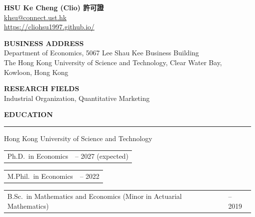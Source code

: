 \documentclass[11pt,letterpaper]{article}
\makeatletter
\newlength{\cvdatecol}
\newcommand{\sectionheader}[1]{%
  \vspace{0.55em}
  {\large\bfseries #1}\\[-0.15em]
  \rule{\textwidth}{0.4pt}\par
  \vspace{0.25em}
}
\newcommand{\cvline}[3][0em]{%
  \par\nobreak
  \noindent\hspace*{#1}%
  \begin{tabularx}{\dimexpr\textwidth-#1\relax}{@{}X@{\hspace{0.75em}}>{\raggedleft\arraybackslash}p{\cvdatecol}@{}}
  #2 & #3 \\
  \end{tabularx}%
}
\makeatother
\begin{document}
\begin{center}
{\LARGE\bfseries HSU Ke Cheng (Clio) 許可證}\\[0.55em]
\href{mailto:khsu@connect.ust.hk}{khsu@connect.ust.hk}\\[0.2em]
\href{https://cliohsu1997.github.io}{https://cliohsu1997.github.io/}
\end{center}

\vspace{0.7em}

\textbf{BUSINESS ADDRESS}\\[0.2em]
\hspace{1.5em} Department of Economics, 5067 Lee Shau Kee Business Building\\
\hspace{1.5em} The Hong Kong University of Science and Technology, Clear Water Bay, Kowloon, Hong Kong

\vspace{0.55em}

\textbf{RESEARCH FIELDS}\\[0.2em]
\hspace{1.5em} Industrial Organization, Quantitative Marketing

\sectionheader{EDUCATION}
{
Hong Kong University of Science and Technology\\[-0.35em]
\cvline[1.5em]{Ph.D.\ in Economics}{2022 -- 2027 (expected)}
\vspace{-0.15em}
\cvline[1.5em]{M.Phil.\ in Economics}{2020 -- 2022}
\vspace{-0.15em}
\cvline[1.5em]{B.Sc.\ in Mathematics and Economics (Minor in Actuarial Mathematics)}{2015 -- 2019}
}
\end{document}
